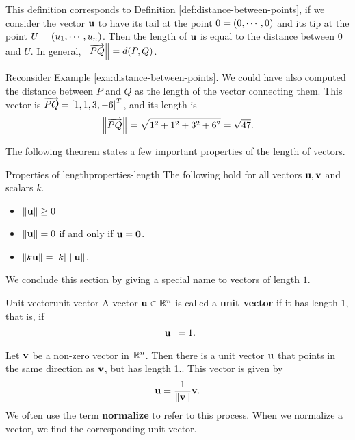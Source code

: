 This definition corresponds to Definition
\ref{def:distance-between-points}, if we consider the vector $\mbox{\bf u}$
to have its tail at the point $0 = \left(0, \cdots ,0 \right)$ and its tip at
the point $U = \left(u_1, \cdots, u_n \right)$.  Then the length of
$\mbox{\bf u}$ is equal to the distance between $0$ and $U$. In general,
$\left\|\overrightarrow{PQ}\right\| = d(P,Q)$.

Reconsider Example \ref{exa:distance-between-points}. We could have also
computed the distance between $P$ and $Q$ as the length of the vector
connecting them. This vector is $\overrightarrow{PQ} = \left[1,1,3,-6\right]^T$,
and its length is
\[
  \left\|\overrightarrow{PQ}\right\| = \sqrt{1^2+1^2+3^2+6^2} = \sqrt{47}.
\]

The following theorem states a few important properties of the length
of vectors.

\begin{theorem}{Properties of length}{properties-length}
  The following hold for all vectors $\mbox{\bf u},\mbox{\bf v}$ and scalars $k$.
  \begin{itemize}
  \item $\left\|\mbox{\bf u}\right\|\geq 0$
  \item $\left\|\mbox{\bf u}\right\|=0$ if and only if $\mbox{\bf u}=\mbox{\bf 0}$.
  \item $\left\|k\mbox{\bf u}\right\| = |k|\,\left\|\mbox{\bf u}\right\|$.
  \end{itemize}
\end{theorem}

We conclude this section by giving a special name to vectors of length
$1$.

\begin{definition}{Unit vector}{unit-vector}
  A vector\/ $\mbox{\bf u}\in\mathbb{R}^n$ is called a
  \textbf{unit vector} if it has
  length $1$, that is, if
  \begin{equation*}
    \left\|\mbox{\bf u}\right\| = 1.
  \end{equation*}
\end{definition}

Let $\mbox{\bf v}$ be a non-zero vector in $\mathbb{R}^{n}$. Then there is a unit
vector $\mbox{\bf u}$ that points in the same direction as $\mbox{\bf v}$, but
has length 1.. This vector is
given by
\begin{equation*}
\mbox{\bf u} = \frac{1}{\left\|\mbox{\bf v}\right\|} \mbox{\bf v}.
\end{equation*}
We often use the term \textbf{normalize}
to refer to this process. When we normalize a vector, we find the
corresponding unit vector.

